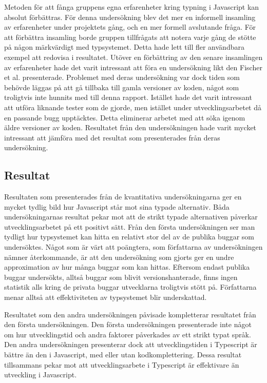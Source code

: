 Metoden för att fånga gruppens egna erfarenheter kring typning i Javascript kan absolut förbättras. För denna undersökning blev det mer en informell insamling av erfarenheter under projektets gång, och en mer formell avslutande fråga. För att förbättra insamling borde gruppen tillfrågats att notera varje gång de stötte på någon märkvärdigt med typsystemet. Detta hade lett till fler användbara exempel att redovisa i resultatet. Utöver en förbättring av den senare insamlingen av erfarenheter hade det varit intressant att föra en undersökning likt den Fischer et al. presenterade. Problemet med deras undersökning var dock tiden som behövde läggas på att gå tillbaka till gamla versioner av koden, något som troligtvis inte hunnits med till denna rapport. Istället hade det varit intressant att utföra liknande tester som de gjorde, men istället under utvecklingsarbetet då en passande bugg upptäcktes. Detta eliminerar arbetet med att söka igenom äldre versioner av koden. Resultatet från den undersökningen hade varit mycket intressant att jämföra med det resultat som presenterades från deras undersökning.



\subsection{Resultat}
\label{subsec:alexander-discussion-results}

Resultaten som presenterades från de kvantitativa undersökningarna ger en mycket tydlig bild hur Javascript står mot sina typade alternativ. Båda undersökningarnas resultat pekar mot att de strikt typade alternativen påverkar utvecklingsarbetet på ett positivt sätt. Från den första undersökningen ser man tydligt hur typsystemet kan hitta en relativt stor del av de publika buggar som undersöktes. Något som är värt att poängtera, som författarna av undersökningen nämner återkommande, är att den undersökning som gjorts ger en undre approximation av hur många buggar som kan hittas. Eftersom endast publika buggar undersökts, alltså buggar som blivit versionshanterade, finns ingen statistik alls kring de privata buggar utvecklarna troligtvis stött på. Författarna menar alltså att effektiviteten av typsystemet blir underskattad.

Resultatet som den andra undersökningen påvisade kompletterar resultatet från den första undersökningen.  Den första undersökningen presenterade inte något om hur utvecklingstid och andra faktorer påverkades av ett strikt typat språk. Den andra undersökningen presenterar dock att utvecklingstiden i Typescript är bättre än den i Javascript, med eller utan kodkomplettering. Dessa resultat tillsammans pekar mot att utvecklingsarbete i Typescript är effektivare än utveckling i Javascript. 

